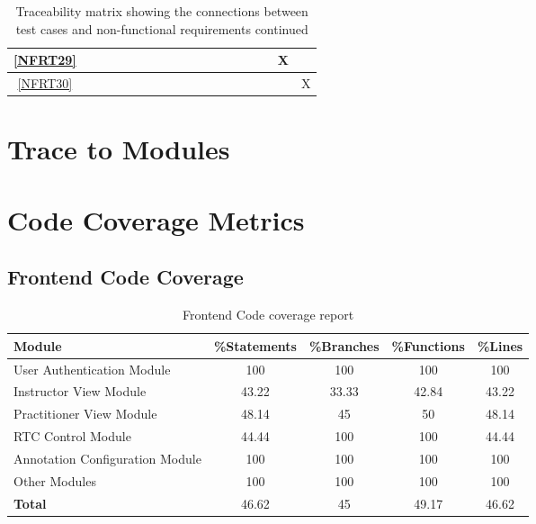 \documentclass[12pt, titlepage]{article}
\begin{document}
\begin{landscape}
\begin{table}[h!]
\begin{tabular}{|c|c|c|c|c|c|c|c|c|c|c|c|c|c|c|c|c|c|}
      \ref{NFRT29} &      &      &     &     &     &     &     &     &     &     &     &     &     &     &     & X   &     \\ \hline
      \ref{NFRT30} &      &      &     &     &     &     &     &     &     &     &     &     &     &     &     &     & X   \\ \hline
    \end{tabular}
    \caption{Traceability matrix showing the connections between test cases
      and non-functional requirements continued}
    \label{tab:nfrt2}
  \end{table}
\end{landscape}
\restoregeometry

\section{Trace to Modules}

\section{Code Coverage Metrics}

\subsection*{Frontend Code Coverage}

\begin{table}[htbp]
  \centering
  \begin{tabular}{@{}lcccc@{}}
  \toprule
  \textbf{Module}                   & \textbf{\%Statements} & \textbf{\%Branches} & \textbf{\%Functions} & \textbf{\%Lines} \\ \midrule
  User Authentication Module             & 100                 & 100              & 100              & 100             \\ 
  Instructor View Module                 & 43.22               & 33.33            & 42.84           & 43.22              \\ 
  Practitioner View Module               & 48.14               & 45               & 50               & 48.14              \\ 
  RTC Control Module                     & 44.44               & 100              & 100              & 44.44             \\ 
  Annotation Configuration Module        & 100                 & 100              & 100              & 100             \\ 
  Other Modules                          & 100                 & 100              & 100              & 100              \\
  \midrule
  \textbf{Total}                         & 46.62               & 45               & 49.17                 & 46.62             \\ \bottomrule
  \end{tabular}
  \caption{Frontend Code coverage report}
  \label{tab:my-table}
\end{table}
\end{document}
